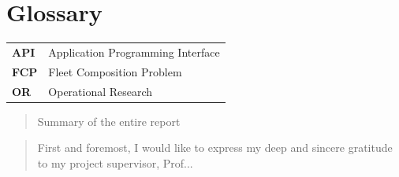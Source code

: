 \documentclass[12pt,a4paper]{article}
\begin{document}
\newpage

\section*{Glossary}
\begin{tabular}{l@{\hskip 1cm} p{10cm}}
    \textbf{API}  & Application Programming Interface \\
    \textbf{FCP}  & Fleet Composition Problem \\
    \textbf{OR}  & Operational Research \\
\end{tabular}

\newpage



\begin{abstract}
    Summary of the entire report
\end{abstract}

\renewcommand{\abstractname}{Acknowledgements}
\begin{abstract}
First and foremost, I would like to express my deep and sincere gratitude to my project supervisor, Prof...
\end{abstract}







\printbibliography
\end{document}
